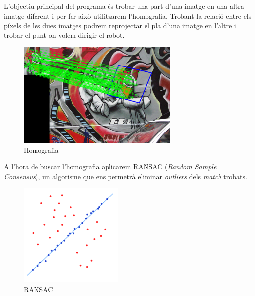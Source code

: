 	L'objectiu principal del programa és trobar una part d'una imatge en una altra imatge diferent i per fer això utilitzarem l'homografia. Trobant la relació entre els píxels de les dues imatges podrem
	reprojectar el pla d'una imatge en l'altre i trobar el punt on volem dirigir el robot.\\
	\begin{figure}[H]
		\centering
		\includegraphics[width=0.7\textwidth]{images/homography}
		\caption{Homografia}
	\end{figure}
	\noindent
	A l'hora de buscar l'homografia aplicarem RANSAC (\textit{Random Sample Consensus})\cite{Fischler:1981:RSC:358669.358692}, un algorisme que ens permetrà eliminar \textit{outliers} dels \textit{match} trobats.\\
	\begin{figure}[H]
		\centering
		\includegraphics[width=0.45\textwidth]{images/ransac}
		\caption{RANSAC}
	\end{figure}
